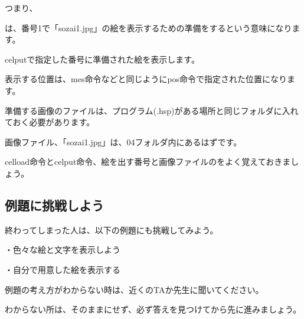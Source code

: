 つまり、


\begin{description}
    \item {}
\end{description}

は、番号1で「sozai1.jpg」の絵を表示するための準備をするという意味になります。

celputで指定した番号に準備された絵を表示します。

表示する位置は、mes命令などと同じようにpos命令で指定された位置になります。

準備する画像のファイルは、プログラム(.hsp)がある場所と同じフォルダに入れておく必要があります。

画像ファイル、「sozai1.jpg」は、04フォルダ内にあるはずです。


celload命令とcelput命令、絵を出す番号と画像ファイルのをよく覚えておきましょう。

\newpage
\subsection{例題に挑戦しよう}


終わってしまった人は、以下の例題にも挑戦してみよう。


・色々な絵と文字を表示しよう

・自分で用意した絵を表示する

例題の考え方がわからない時は、近くのTAか先生に聞いてください。

わからない所は、そのままにせず、必ず答えを見つけてから先に進みましょう。













